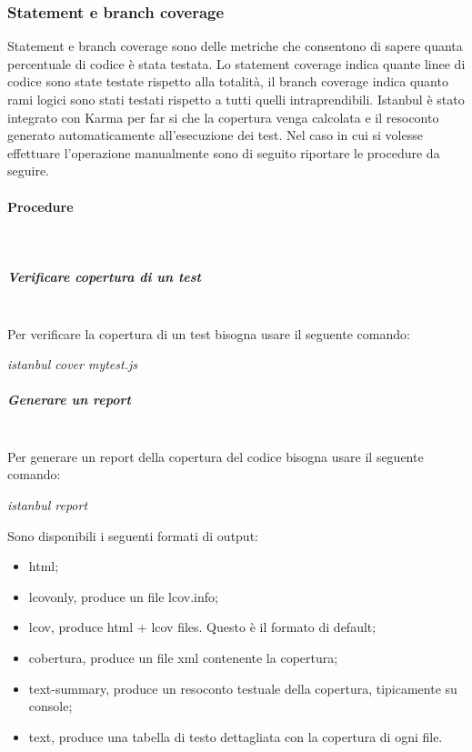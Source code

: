 \subsubsection{Statement e branch coverage}
Statement e branch coverage sono delle metriche che consentono di sapere quanta percentuale di codice è stata testata.
Lo statement coverage indica quante linee di codice sono state testate rispetto alla totalità, il branch coverage indica quanto rami logici sono stati testati rispetto a tutti quelli intraprendibili.
Istanbul è stato integrato con Karma per far si che la copertura venga calcolata e il resoconto generato automaticamente all'esecuzione dei test.
Nel caso in cui si volesse effettuare l'operazione manualmente sono di seguito riportare le procedure da seguire.
\paragraph{Procedure} \hfill \\
\subparagraph{Verificare copertura di un test} \hfill \\
Per verificare la copertura di un test bisogna usare il seguente comando:\\
\begin{center}
\textit{istanbul cover mytest.js}\\
\end{center}

\subparagraph{Generare un report} \hfill \\
Per generare un report della copertura del codice bisogna usare il seguente comando:\\

\begin{center}
\textit{istanbul report}\\
\end{center}
Sono disponibili i seguenti formati di output:
\begin{itemize}
\item html;
\item lcovonly, produce un file lcov.info;
\item lcov, produce html + lcov files. Questo è il formato di default;
\item cobertura, produce un file xml contenente la copertura;
\item text-summary, produce un resoconto testuale della copertura, tipicamente su console;
\item text, produce una tabella di testo dettagliata con la copertura di ogni file.
\end{itemize}

